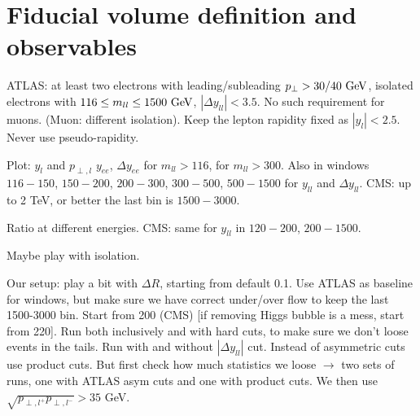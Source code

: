 \documentclass[a4paper]{article}
\begin{document}
\section{Fiducial volume definition and observables}
ATLAS: at least two electrons with leading/subleading $p_\perp >
30/40~\rm{GeV}$, isolated electrons with $116 \le m_{ll} \le
1500~\rm{GeV}$, $|\Delta y_{ll}| < 3.5$. No such requirement for muons.
(Muon: different isolation). Keep the lepton rapidity fixed as
$|y_l| < 2.5$. Never use pseudo-rapidity. 

Plot: $y_l$ and $p_{\perp,l}$ $y_{ee}$, $\Delta y_{ee}$ for $m_{ll}> 116$, for $m_{ll}> 300$. Also in windows $116 - 150$, $150-200$, $200 - 300$, $300-500$,
$500-1500$ for $y_{ll}$ and $\Delta y_{ll}$. CMS: up to 2 TeV, or better the
last bin is $1500-3000$.

Ratio at different energies. CMS: same for $y_{ll}$ in $120-200$, $200-1500$. 

Maybe play with isolation.

Our setup: play a bit with $\Delta R$, starting from default 0.1. Use ATLAS
as baseline for windows, but make sure we have correct under/over flow to
keep the last 1500-3000 bin. Start from 200 (CMS) [if removing Higgs bubble
  is a mess, start from 220].
Run both inclusively and with hard cuts, to
make sure we don't loose events in the tails. Run with and without $|\Delta y_{ll}|$ cut. Instead of asymmetric cuts use product cuts. But first check
how much statistics we loose $\to$ two sets of runs, one with ATLAS asym cuts
and one with product cuts. We then use $\sqrt{p_{\perp,l^+} p_{\perp,l^-}} > 35$ GeV. 
\end{document}
